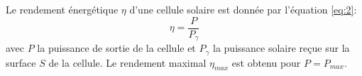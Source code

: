 Le rendement énergétique \(\eta\) d'une cellule solaire est donnée par l'équation \ref{eq:2}:
\begin{equation}
    \eta = \frac{P}{P_\gamma}
    \label{eq:2}
\end{equation}
avec \(P\) la puissance de sortie de la cellule et \(P_\gamma\) la puissance solaire reçue sur la surface \(S\) de la cellule.
Le rendement maximal \(\eta_{max}\) est obtenu pour \(P = P_{max}\).
